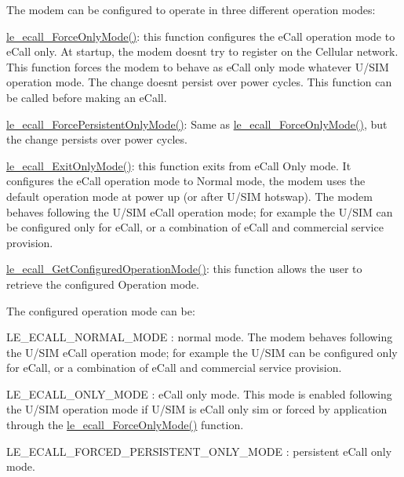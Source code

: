 The modem can be configured to operate in three different operation modes\+:
\begin{DoxyItemize}
\item \hyperlink{le__ecall__interface_8h_a042d52c84b5b679ab32dd814c5b0be9e}{le\+\_\+ecall\+\_\+\+Force\+Only\+Mode()}\+: this function configures the e\+Call operation mode to e\+Call only. At startup, the modem doesn\textquotesingle{}t try to register on the Cellular network. This function forces the modem to behave as e\+Call only mode whatever U/\+S\+IM operation mode. The change doesn\textquotesingle{}t persist over power cycles. This function can be called before making an e\+Call.
\item \hyperlink{le__ecall__interface_8h_ad468828b0024de378d91ea9c30fd6f3f}{le\+\_\+ecall\+\_\+\+Force\+Persistent\+Only\+Mode()}\+: Same as \hyperlink{le__ecall__interface_8h_a042d52c84b5b679ab32dd814c5b0be9e}{le\+\_\+ecall\+\_\+\+Force\+Only\+Mode()}, but the change persists over power cycles.
\item \hyperlink{le__ecall__interface_8h_a924114fa7fab10c3f351766a76134f34}{le\+\_\+ecall\+\_\+\+Exit\+Only\+Mode()}\+: this function exits from e\+Call Only mode. It configures the e\+Call operation mode to Normal mode, the modem uses the default operation mode at power up (or after U/\+S\+IM hotswap). The modem behaves following the U/\+S\+IM e\+Call operation mode; for example the U/\+S\+IM can be configured only for e\+Call, or a combination of e\+Call and commercial service provision.
\item \hyperlink{le__ecall__interface_8h_a8e245065491b14f46405e415ea17b6b8}{le\+\_\+ecall\+\_\+\+Get\+Configured\+Operation\+Mode()}\+: this function allows the user to retrieve the configured Operation mode.
\end{DoxyItemize}

The configured operation mode can be\+:
\begin{DoxyItemize}
\item {\ttfamily L\+E\+\_\+\+E\+C\+A\+L\+L\+\_\+\+N\+O\+R\+M\+A\+L\+\_\+\+M\+O\+DE} \+: normal mode. The modem behaves following the U/\+S\+IM e\+Call operation mode; for example the U/\+S\+IM can be configured only for e\+Call, or a combination of e\+Call and commercial service provision.
\item {\ttfamily L\+E\+\_\+\+E\+C\+A\+L\+L\+\_\+\+O\+N\+L\+Y\+\_\+\+M\+O\+DE} \+: e\+Call only mode. This mode is enabled following the U/\+S\+IM operation mode if U/\+S\+IM is e\+Call only sim or forced by application through the \hyperlink{le__ecall__interface_8h_a042d52c84b5b679ab32dd814c5b0be9e}{le\+\_\+ecall\+\_\+\+Force\+Only\+Mode()} function.
\item {\ttfamily L\+E\+\_\+\+E\+C\+A\+L\+L\+\_\+\+F\+O\+R\+C\+E\+D\+\_\+\+P\+E\+R\+S\+I\+S\+T\+E\+N\+T\+\_\+\+O\+N\+L\+Y\+\_\+\+M\+O\+DE} \+: persistent e\+Call only mode.
\end{DoxyItemize}


